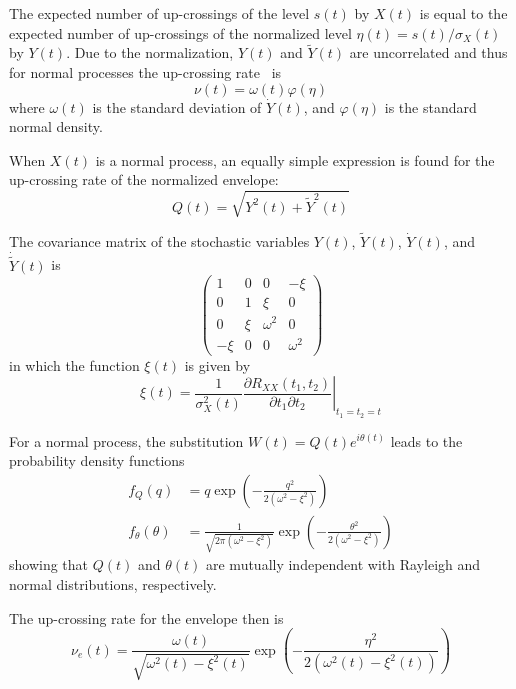 \documentclass[12pt]{article}
\begin{document}
The expected number of up-crossings of the level $s(t)$ by $X(t)$ is equal to the expected number of up-crossings of the normalized level $\eta(t) = s(t)/\sigma_X(t)$ by $Y(t)$. Due to the normalization, $Y(t)$ and $\tilde{Y}(t)$ are uncorrelated and thus for normal processes the up-crossing rate~\cite{rice1955} is
\begin{equation}
    \nu(t) = \omega(t) \varphi(\eta)
    \label{eq:upcrossing}
\end{equation}
where $\omega(t)$ is the standard deviation of $\dot{Y}(t)$, and $\varphi(\eta)$ is the standard normal density.

When $X(t)$ is a normal process, an equally simple expression is found for the up-crossing rate of the normalized envelope:
\begin{equation}
    Q(t) = \sqrt{Y^2(t) + \tilde{Y}^2(t)}
    \label{eq:Q_envelope}
\end{equation}

The covariance matrix of the stochastic variables $Y(t)$, $\tilde{Y}(t)$, $\dot{Y}(t)$, and $\dot{\tilde{Y}}(t)$ is
\begin{equation}
    \begin{pmatrix}
        1 & 0 & 0 & -\xi \\
        0 & 1 & \xi & 0 \\
        0 & \xi & \omega^2 & 0 \\
        -\xi & 0 & 0 & \omega^2
    \end{pmatrix}
    \label{eq:cov_matrix}
\end{equation}
in which the function $\xi(t)$ is given by
\begin{equation}
    \xi(t) = \frac{1}{\sigma_X^2(t)} \left. \frac{\partial R_{XX}(t_1, t_2)}{\partial t_1 \partial t_2} \right|_{t_1 = t_2 = t}
    \label{eq:xi}
\end{equation}

For a normal process, the substitution $W(t) = Q(t) e^{i\theta(t)}$ leads to the probability density functions
\begin{align}
    f_Q(q) &= q \exp\left( -\frac{q^2}{2(\omega^2 - \xi^2)} \right) \label{eq:fQ} \\
    f_\theta(\theta) &= \frac{1}{\sqrt{2\pi(\omega^2 - \xi^2)}} \exp\left( -\frac{\theta^2}{2(\omega^2 - \xi^2)} \right) \label{eq:ftheta}
\end{align}
showing that $Q(t)$ and $\theta(t)$ are mutually independent with Rayleigh and normal distributions, respectively.

The up-crossing rate for the envelope then is
\begin{equation}
    \nu_e(t) = \frac{\omega(t)}{\sqrt{\omega^2(t) - \xi^2(t)}} \exp\left( -\frac{\eta^2}{2(\omega^2(t) - \xi^2(t))} \right)
    \label{eq:nu_e}
\end{equation}
\end{document}
